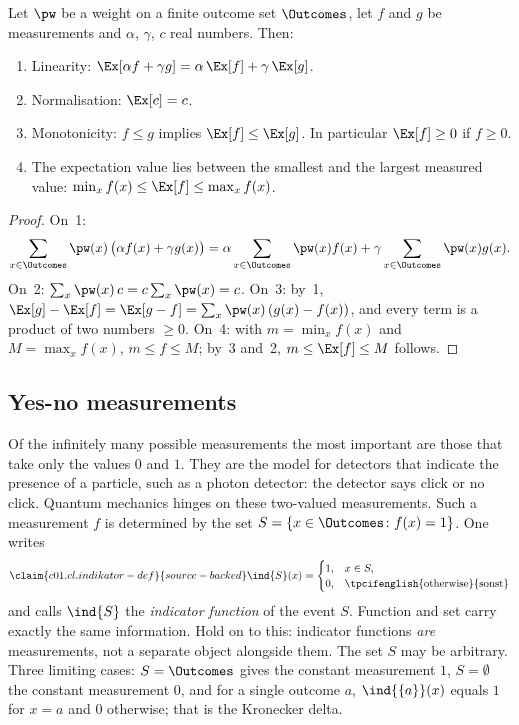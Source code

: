 \begin{proposition}\label{c01.prop.erwartung}
  Let $\pw$ be a weight on a finite outcome set $\Outcomes$, let $f$ and $g$ be
  measurements and $\alpha$, $\gamma$, $c$ real numbers. Then:
  \begin{enumerate}
    \item Linearity: $\Ex[\alpha f + \gamma g] = \alpha\, \Ex[f] + \gamma\, \Ex[g]$.
    \item Normalisation: $\Ex[c] = c$.
    \item Monotonicity: $f \leq g$ implies $\Ex[f] \leq \Ex[g]$. In particular
      $\Ex[f] \geq 0$ if $f \geq 0$.
    \item The expectation value lies between the smallest and the largest measured value:
      $\min_x f(x) \leq \Ex[f] \leq \max_x f(x)$.
  \end{enumerate}
\end{proposition}
\begin{proof}
  On~1:
  \begin{equation}\label{c01.eq.linear}
    \sum_{x \in \Outcomes} \pw(x)\,\bigl(\alpha f(x) + \gamma g(x)\bigr)
    = \alpha \sum_{x \in \Outcomes} \pw(x) f(x) + \gamma \sum_{x \in \Outcomes} \pw(x) g(x) .
  \end{equation}
  On~2: $\sum_x \pw(x)\, c = c \sum_x \pw(x) = c$. On~3: by~1,
  $\Ex[g] - \Ex[f] = \Ex[g - f] = \sum_x \pw(x)\,(g(x) - f(x))$, and every term is a
  product of two numbers $\geq 0$. On~4: with $m = \min_x f(x)$ and $M = \max_x f(x)$,
  $m \leq f \leq M$; by~3 and~2, $m \leq \Ex[f] \leq M$ follows.
\end{proof}

\subsection{Yes-no measurements}\label{c01.s2.3}

Of the infinitely many possible measurements the most important are those that take only
the values $0$ and $1$. They are the model for detectors that indicate the presence of a
particle, such as a photon detector: the detector says click or no click. Quantum mechanics
hinges on these two-valued measurements.
Such a measurement $f$ is determined by the set $S = \{x \in \Outcomes \colon f(x) = 1\}$.
One writes
\begin{equation}\label{c01.eq.indikator-def}\claim{c01.cl.indikator-def}{source-backed}
  \ind{S}(x) =
  \begin{cases}
    1, & x \in S, \\
    0, & \text{\tpcifenglish{otherwise}{sonst}}
  \end{cases}
\end{equation}
and calls $\ind{S}$ the \emph{indicator function} of the event $S$. Function and set carry
exactly the same information. Hold on to this: indicator functions \emph{are} measurements,
not a separate object alongside them. The set $S$ may be arbitrary. Three limiting cases:
$S = \Outcomes$ gives the constant measurement $1$, $S = \emptyset$ the constant measurement
$0$, and for a single outcome $a$, $\ind{\{a\}}(x)$ equals $1$ for $x = a$ and $0$
otherwise; that is the Kronecker delta.

